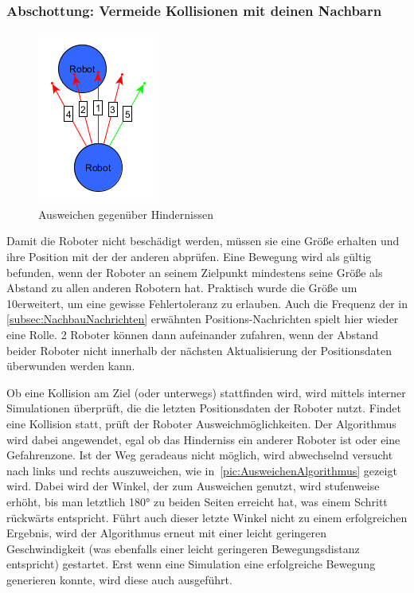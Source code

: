 \subsubsection*{Abschottung: Vermeide Kollisionen mit deinen Nachbarn}

\begin{figure}
	\includegraphics[width=\pictureWidth,keepaspectratio]{graphics/AusweichenAlgorithmus.png}
	\caption{Ausweichen gegenüber Hindernissen}
	\label{pic:AusweichenAlgorithmus}
\end{figure}

Damit die Roboter nicht beschädigt werden, müssen sie eine Größe erhalten und ihre Position mit der der anderen abprüfen. Eine Bewegung wird als gültig befunden, wenn der Roboter an seinem Zielpunkt mindestens seine Größe als Abstand zu allen anderen Robotern hat. Praktisch wurde die Größe um 10\per erweitert, um eine gewisse Fehlertoleranz zu erlauben.
Auch die Frequenz der in \autoref{subsec:NachbauNachrichten} erwähnten Positions-Nachrichten spielt hier wieder eine Rolle. 2 Roboter können dann aufeinander zufahren, wenn der Abstand beider Roboter nicht innerhalb der nächsten Aktualisierung der Positionsdaten überwunden werden kann.

Ob eine Kollision am Ziel (oder unterwegs) stattfinden wird, wird mittels interner Simulationen überprüft, die die letzten Positionsdaten der Roboter nutzt.
Findet eine Kollision statt, prüft der Roboter Ausweichmöglichkeiten. Der Algorithmus wird dabei angewendet, egal ob das Hinderniss ein anderer Roboter ist oder eine Gefahrenzone. Ist der Weg geradeaus nicht möglich, wird abwechselnd versucht nach links und rechts auszuweichen, wie in~\autoref{pic:AusweichenAlgorithmus} gezeigt wird. Dabei wird der Winkel, der zum Ausweichen genutzt, wird stufenweise erhöht, bis man letztlich 180° zu beiden Seiten erreicht hat, was einem Schritt rückwärts entspricht. Führt auch dieser letzte Winkel nicht zu einem erfolgreichen Ergebnis, wird der Algorithmus erneut mit einer leicht geringeren Geschwindigkeit (was ebenfalls einer leicht geringeren Bewegungsdistanz entspricht) gestartet. Erst wenn eine Simulation eine erfolgreiche Bewegung generieren konnte, wird diese auch ausgeführt.


